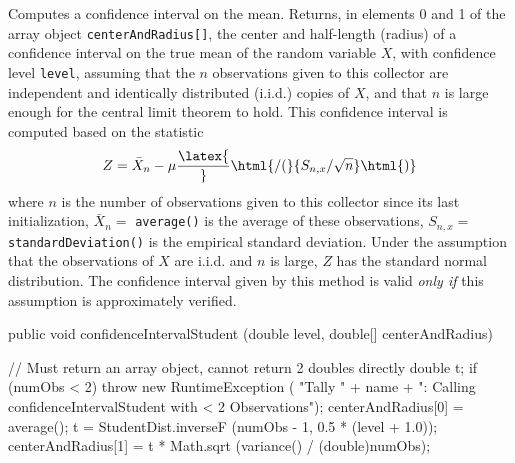   \begin{tabb} Computes a confidence interval on the mean.
  Returns, in elements 0 and 1 of the array
  object \texttt{centerAndRadius[]}, the center and half-length (radius)
  of a confidence interval on the true mean of the random variable $X$,
  with confidence level \texttt{level}, assuming that the $n$ observations
  given to this collector are independent and identically distributed
  (i.i.d.) copies of $X$, and that $n$ is large enough for the central limit
  theorem to hold.  This confidence interval is computed based on the statistic
  $$
    Z = {\bar X_n - \mu\latex{\over}\html{ / (}{S_{n,x}/\sqrt{n}}\html{)}}
  $$
  where $n$ is the number of observations given to this collector since its
  last initialization, $\bar X_n =$ \texttt{average()} is the average of these
  observations, $S_{n,x} =$ \texttt{standardDeviation()} is the empirical
  standard  deviation.  Under the assumption that the observations
  of $X$ are  i.i.d.{} and $n$ is large,
  $Z$ has the standard normal distribution.
  The confidence interval given by this method is valid \emph{only if}
  this assumption is approximately verified.
 \end{tabb}
\begin{htmlonly}
\end{htmlonly}
\begin{code}

   public void confidenceIntervalStudent (double level,
                                          double[] centerAndRadius) \begin{hide} {
      // Must return an array object, cannot return 2 doubles directly
      double t;
      if (numObs < 2) throw new RuntimeException (
          "Tally " + name +
          ": Calling confidenceIntervalStudent with < 2 Observations");
      centerAndRadius[0] =  average();
      t = StudentDist.inverseF (numObs - 1, 0.5 * (level + 1.0));
      centerAndRadius[1] = t * Math.sqrt (variance() / (double)numObs);
   }\end{hide}
\end{code}
